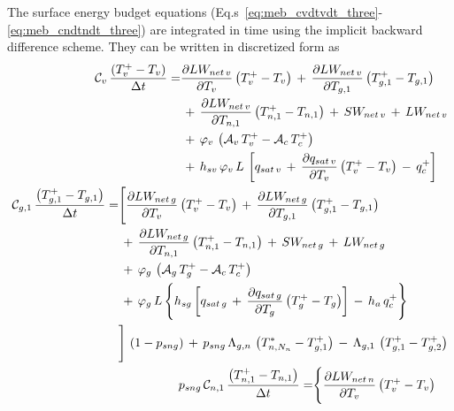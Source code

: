 {The surface energy budget equations 
(Eq.s~\ref{eq:meb_cvdtvdt_three}-\ref{eq:meb_cndtndt_three})
are integrated in time using the
implicit backward difference scheme. They can be written in discretized
form as
%
\begin{align}
%
\label{eq:meb_discret_ebud_v}
\begin{split}
%
{\mathcal C}_v\, {\frac{\left(T_v^+-T_v\right)}{\Delta t}} =&
      {\frac{\partial LW_{net\,v}}{\partial T_v}}\left(T_v^+-T_v \right)
\,+\, {\frac{\partial LW_{net\,v}}{\partial T_{g,1}}}\left(T_{g,1}^+-T_{g,1}\right)
\\
&
\,+\, {\frac{\partial LW_{net\,v}}{\partial T_{n,1}}}\left(T_{n,1}^+-T_{n,1}\right)
\,+\, SW_{net\,v} \,+\, LW_{net\,v} 
\\
&
\,+\, \varphi_{v} \, \left( {\mathcal A}_v \, T_v^+ - {\mathcal A}_c \, T_c^+ \right)
\\
&
\,+\, h_{sv} \, \varphi_{v} \, L \,
\left[ q_{sat\,v} \,+\, {\frac{\partial q_{sat\,v}}{\partial T_v}}
\left(T_v^+-T_v \right) \,-\, q_c^+ \right]
%
\end{split}
\\
%
\label{eq:meb_discret_ebud_g}
\begin{split}
%
{\mathcal C}_{g,1}\,{\frac{\left(T_{g,1}^+-T_{g,1}\right)}{\Delta t}} =&
\Biggr\lbrack
      {\frac{\partial LW_{net\,{g}}}{\partial T_v}}\left(T_v^+-T_v \right)
\,+\, {\frac{\partial LW_{net\,{g}}}{\partial T_{g,1}}}\left(T_{g,1}^+-T_{g,1}\right)
\\
&
\,+\, {\frac{\partial LW_{net\,{g}}}{\partial T_{n,1}}}\left(T_{n,1}^+-T_{n,1}\right)
\,+\, SW_{net\,g} \,+\, LW_{net\,g} 
\\
&
\,+\, \varphi_{g} \, \left( {\cal A}_g \, T_g^+ - {\cal A}_c \, T_c^+ \right)
\\
&
\,+\, \varphi_{g} \, L \,
\Bigg\lbrace
h_{sg} \left[ q_{sat\,g} \,+\, {\frac{\partial q_{sat\,g}}{\partial T_g}}
\left(T_g^+-T_g \right)\right] \,-\, h_a\,q_c^+ 
\Bigg\rbrace
\\
&
\Biggr\rbrack \, \left(1-p_{sng}\right) 
\,+\,
p_{sng} \,
\Lambda_{g,n}\,\left( T_{n,N_n}^\ast - T_{g,1}^+ \right)
\,-\,
\Lambda_{g,1}\,\left( T_{g,1}^+ - T_{g,2}^+ \right)
\end{split}
\\
%
\label{eq:meb_discret_ebud_n}
\begin{split}
%
p_{sng}\,{\cal C}_{n,1}\, {\frac{\left(T_{n,1}^+-T_{n,1}\right)}{\Delta t}} =&
\Biggr\lbrace
      {\frac{\partial LW_{net\,{n}}}{\partial T_v}}\left(T_v^+-T_v \right)

\end{split}
\end{align}}
